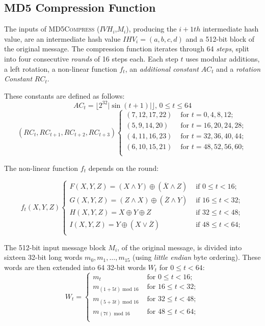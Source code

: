 \subsection{MD5 Compression Function}\label{sec:compressionMD5}
The inputs of \textsc{MD5Compress} ($IVH_i$,$M_i$), producing the $i+1{th}$ intermediate hash value, are an intermediate hash value $IHV_{i}=(a,b,c,d)$ and a 512-bit block of the original message. The compression function iterates through 64 \emph{steps}, split into four consecutive \emph{rounds} of 16 steps each. Each step $t$ uses modular additions, a left rotation, a non-linear function $f_t$, an \emph{additional constant} $AC_t$ and a  \emph{rotation Constant} $RC_t$.

These constants are defined as follows:
\begin{equation}
AC_t = \lfloor 2^{32} \vert \sin(t+1)\vert \rfloor \mbox{, }  0\le t\le 64
\end{equation}
\begin{equation}
(RC_t, RC_{t+1}, RC_{t+2}, RC_{t+3})
\begin{cases}
(7, 12, 17, 22) & \mbox{ for } t = 0,4,8,12; \\
(5, 9, 14, 20) & \mbox{ for } t = 16, 20, 24, 28;\\
(4, 11, 16, 23) & \mbox{ for } t = 32, 36, 40, 44; \\
(6, 10, 15, 21) & \mbox{ for } t = 48,52,56,60; \\
\end{cases}
\end{equation}

The non-linear function $f_t$ depends on the round:

\begin{equation}
f_t(X,Y,Z)
\begin{cases}
F(X, Y, Z) = (X \wedge Y) \oplus (\overline{X} \wedge Z) & \mbox{ if } 0 \le t < 16; \\
G(X, Y, Z) = (Z \wedge X) \oplus (\overline{Z} \wedge Y) & \mbox{ if } 16 \le t < 32; \\
H(X, Y, Z) = X \oplus Y \oplus Z & \mbox{ if } 32 \le t < 48; \\
I(X, Y, Z) = Y \oplus (X \vee \overline{Z}) & \mbox{ if } 48 \le t < 64; \\
\end{cases}
\end{equation}

The 512-bit input message block $M_i$, of the original message, is divided into sixteen 32-bit long words $m_0,m_1,\ldots,m_{15}$ (using \emph{little endian} byte ordering). These words are then extended into 64 32-bit words $W_t$ for $0 \le t < 64$:
\begin{equation}
W_t =
\begin{cases}
m_t & \mbox{ for } 0 \le t < 16; \\
m_{(1+5t)\mbox{ mod }16} & \mbox{ for } 16 \le t < 32; \\
m_{(5+3t)\mbox{ mod }16} & \mbox{ for } 32 \le t < 48; \\
m_{(7t)\mbox{ mod }16} & \mbox{ for } 48 \le t < 64; \\
\end{cases}
\end{equation}

